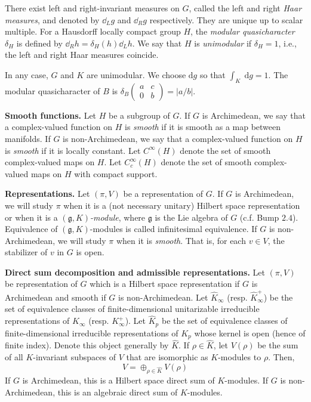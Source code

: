 \documentclass[12pt, letterpaper, twoside]
{article}
\newcommand{\dd}[1]{\mathrm{d}#1} %
\newcommand{\gI}{\mathfrak{g}} %
\begin{document}
There exist left and right-invariant measures on $G$, called the left and right
\textit{Haar measures}, and denoted by $\dd_Lg$ and $\dd_Rg$ respectively. They
are unique up to scalar multiple. For a Hausdorff locally compact group $H$, the
\textit{modular quasicharacter} $\delta_H$ is defined by $\dd_R h = \delta_H
(h)\dd_L h$. We say that $H$ is \textit{unimodular} if $\delta_H = 1$, i.e., the
left and right Haar measures coincide.

In any case, $G$ and $K$ are unimodular. We choose $\dd g$ so that $\int_K \;
\dd g = 1$. The modular quasicharacter of $B$ is $\delta_B
\begin{pmatrix} a & c \\ 0 & b \end{pmatrix} = |a/b|$. 

\textbf{Smooth functions.} Let $H$ be a subgroup of $G$. If $G$ is Archimedean,
we say that a complex-valued function on $H$ is \textit{smooth} if it is smooth
as a map between manifolds. If $G$ is non-Archimedean, we say that a
complex-valued function on $H$ is \textit{smooth} if it is locally constant. Let
$C^\infty(H)$ denote the set of smooth complex-valued maps on $H$. Let
$C_c^\infty(H)$ denote the set of smooth complex-valued maps on $H$ with compact
support.

\textbf{Representations.} Let $(\pi, V)$ be a representation of $G$. If $G$ is
Archimedean, we will study $\pi$ when it is a (not necessary unitary) Hilbert
space representation or when it is a $(\gI, K)$\textit{-module}, where $\gI$ is
the Lie algebra of $G$ (c.f. Bump $2.4$). Equivalence of $(\gI, K)$-modules is
called infinitesimal equivalence. If $G$ is non-Archimedean, we will study $\pi$
when it is \textit{smooth}. That is, for each $v \in V$, the stabilizer of $v$
in $G$ is open.

\textbf{Direct sum decomposition and admissible representations.} Let $(\pi, V)$
be representation of $G$ which is a Hilbert space representation if $G$ is
Archimedean and smooth if $G$ is non-Archimedean. Let $\hat{K}_\infty$ (resp.
$\hat{K}_\infty^+$) be the set of equivalence classes of finite-dimensional
unitarizable irreducible representations of $K_\infty$ (resp. $K_\infty^+$). Let
$\hat{K}_p$ be the set of equivalence classes of finite-dimensional irreducible
representations of $K_p$ whose kernel is open (hence of finite index). Denote
this object generally by $\hat{K}$. If $\rho \in \hat{K}$, let $V(\rho)$ be the
sum of all $K$-invariant subspaces of $V$ that are isomorphic as $K$-modules to
$\rho$. Then,
\[V = \oplus_{\rho \in \hat{K}} V(\rho)\] If $G$ is Archimedean, this is a
Hilbert space direct sum of $K$-modules. If $G$ is non-Archimedean, this is an
algebraic direct sum of $K$-modules.
\end{document}
